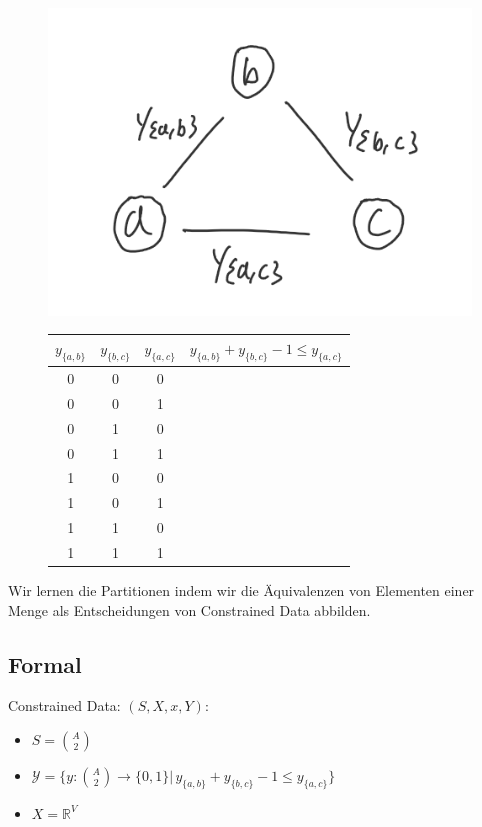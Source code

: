 \documentclass[12pt,a4paper]{article}
\newcommand{\red}[1]{\textcolor{red} {#1}}
\newcommand{\green}[1]{\textcolor{green} {#1}}
\newcommand{\cmark}{\ding{51}}%
\newcommand{\xmark}{\ding{55}}%
\begin{document}
\begin{figure}[ht]
\begin{minipage}[t]{0.5\linewidth}
\centering
\includegraphics[width=0.9\linewidth]{./resources/y_partition.png}
\end{minipage}%
\begin{minipage}[t]{0.5\linewidth}
\begin{tabular}{|c|c|c|c|}
\hline
$y_{\{a,b\}}$ & $y_{\{b,c\}}$ & $y_{\{a,c\}}$ & $y_{\{a,b\}} + y_{\{b,c\}} -1\leq y_{\{a,c\}}$ \\
\hline
0 & 0 & 0 & \green{\cmark}\\
\hline
0 & 0 & 1 & \green{\cmark}\\
\hline
0 & 1 & 0 & \green{\cmark}\\
\hline
0 & 1 & 1 & \green{\cmark}\\
\hline
1 & 0 & 0 & \green{\cmark}\\
\hline
1 & 0 & 1 & \green{\cmark}\\
\hline
1 & 1 & 0 & \red{\xmark}\\
\hline
1 & 1 & 1 & \green{\cmark}\\
\hline
\end{tabular}
\end{minipage}
\end{figure}
Wir lernen die Partitionen indem wir die Äquivalenzen von Elementen einer Menge als Entscheidungen von Constrained Data abbilden.
\subsection{Formal}
Constrained Data: $(S,X,x,Y)$:
\begin{itemize}
\item $S=\binom{A}{2}$
\item $\displaystyle \mathcal{Y} =\big\{ y:\binom{A}{2} \rightarrow \{0,1\} \big\vert \, y_{\{a,b\}} + y_{\{b,c\}} -1\leq y_{\{a,c\}} \big \}$
\item $X = \mathbb{R}^V$
\end{itemize}
\end{document}
